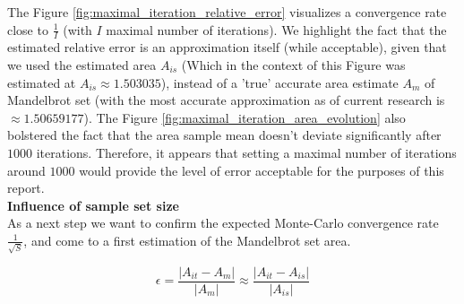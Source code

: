 \documentclass{article}
\begin{document}
    The Figure \ref{fig:maximal_iteration_relative_error} visualizes a convergence rate close to $\frac{1}{I}$ (with $I$ maximal number of iterations). We highlight the fact that the estimated relative error is an approximation itself (while acceptable), given that we used the estimated area $A_{is}$ (Which in the context of this Figure was estimated at $A_{is} \approx 1.503035$), instead of a 'true' accurate area estimate $A_m$ of Mandelbrot set (with the most accurate approximation as of current research is $\approx 1.50659177$). The Figure \ref{fig:maximal_iteration_area_evolution} also bolstered the fact that the area sample mean doesn't deviate significantly after $1000$ iterations. Therefore, it appears that setting a maximal number of iterations around $1000$ would provide the level of error acceptable for the purposes of this report.\\

    \textbf{Influence of sample set size}\\
    As a next step we want to confirm the expected Monte-Carlo convergence rate $\frac{1}{\sqrt{S}}$, and come to a first estimation of the Mandelbrot set area.

    \begin{equation}
        \epsilon = \frac{|A_{it} - A_m|}{|A_m|} \approx \frac{|A_{it} - A_{is}|}{|A_{is}|}
        \label{eq:samples_relative_error}
    \end{equation}
\end{document}
